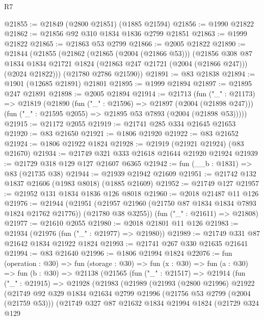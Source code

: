 \begin{lexlean}{R7}
\begin{coremodule}
@21855 := @21849 (@2800 @21851) (@1885 @21594)
@21856 := @1990 @21822
@21862 := @21856 @92 @310 @1834 @1836 @2799 @21851
@21863 := @1999 @21822
@21865 := @21863 @53 @2799
@21866 := @2005 @21822
@21890 := @21844
    (@21855
      (@21862
        (@21865 (@2004 (@21866 @53)))
        (@21856
          @308
          @87
          @1834
          @1834
          @21721
          @1824
          (@21863 @247 @21721 (@2004 (@21866 @247)))
          (@2024 @21822)))
      (@21780 @2786 @21590))
@21891 := @83 @21838
@21894 := @1901 (@12685 @21891) @21801
@21895 := @1999 @21894
@21897 := @21895 @247 @21891
@21898 := @2005 @21894
@21914 := @21713
    (fun ("_" : @21173) =>
    @21819
      (@21890
        (fun ("_" : @21596) => @21897 (@2004 (@21898 @247)))
        (fun ("_" : @21595 @2055) => @21895 @53 @7893 (@2004 (@21898 @53)))))
@21915 := @21172 @2055
@21919 := @21741 @285 @334 @21645 @21653
@21920 := @83 @21650
@21921 := @1806 @21920
@21922 := @83 @21652
@21924 := @1806 @21922 @1824
@21928 := @21919 (@21921 @21924) (@83 @21670)
@21934 := @21749 @321 @333 @21618 @21644 @21920 @21924
@21939 := @21729 @318 @129 @127 @21607 @6365
@21942 := fun (__b : @1831) => @83 (@21735 @38)
@21944 := @21939 @21942 @21609
@21951 := @21742 @132 @1837 @21606 (@1983 @8018) (@1885 @21609)
@21952 := @21749 @127
@21957 := @21952 @131 @1834 @1836 @126 @8018
@21960 := @2018 @21487 @11 @126
@21976 := @21944
    (@21951 (@21957 @21960 (@21750 @87 @1834 @1834 @7893 @1824 @21762 @21776)) (@21780 @38 @3255))
    (fun ("_" : @21611) => @21808)
@21977 := @21610 @2055
@21980 := @2018 @21801 @11 @126
@21983 := @21934 (@21976 (fun ("_" : @21977) => @21980))
@21989 := @21749 @331 @87 @21642 @1834 @21922 @1824
@21993 := @21741 @267 @330 @21635 @21641
@21994 := @83 @21640
@21996 := @1806 @21994 @1824
@22076 := fun (operation : @30) =>
  fun (storage : @30) =>
  fun (x : @30) =>
  fun (a : @30) =>
  fun (b : @30) =>
  @21138
    (@21565
      (fun ("_" : @21517) =>
      @21914
        (fun ("_" : @21915) =>
        @21928
          (@21983
            (@21989
              (@21993
                (@2800 @21996)
                @21922
                (@21749
                  @92
                  @329
                  @1834
                  @21634
                  @2799
                  @21996
                  (@21756 @53 @2799 (@2004 (@21759 @53)))
                  (@21749
                    @327
                    @87
                    @21632
                    @1834
                    @21994
                    @1824
                    (@21729
                      @324
                      @129

\end{coremodule}
\end{lexlean}
